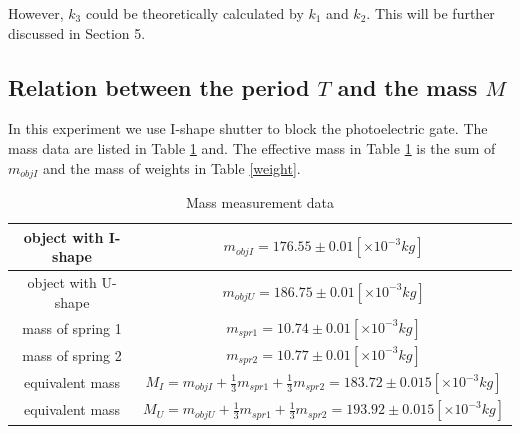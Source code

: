     However, $k_3$ could be theoretically calculated by $k_1$ and $k_2$. This will be further discussed in Section 5.\\

\subsection{Relation between the period $T$ and the mass $M$}
    In this experiment we use I-shape shutter to block the photoelectric gate. The mass data are listed in Table \ref{M} and. The effective mass in Table \ref{M} is the sum of $m_{objI}$ and the mass of weights in Table \ref{weight}.

    \begin{table}[h]
        \centering
        \begin{tabular}{|c|c|}
            \hline
            object with I-shape & $m_{objI}=176.55\pm 0.01[\times10^{-3}kg]$\\ \hline
            object with U-shape & $m_{objU}=186.75\pm 0.01[\times10^{-3}kg]$\\ \hline
            mass of spring 1 & $m_{spr1}=10.74\pm 0.01[\times10^{-3}kg]$\\ \hline
            mass of spring 2 & $m_{spr2}=10.77\pm 0.01[\times10^{-3}kg]$\\ \hline
            equivalent mass & $M_I=m_{objI}+\frac{1}{3}m_{spr1}+\frac{1}{3}m_{spr2}=183.72\pm 0.015[\times10^{-3}kg]$\\ \hline
            equivalent mass & $M_U=m_{objU}+\frac{1}{3}m_{spr1}+\frac{1}{3}m_{spr2}=193.92\pm 0.015[\times10^{-3}kg]$\\ \hline
        \end{tabular}
        \caption{Mass measurement data}\label{M}
    \end{table}
    \vspace{1cm}

